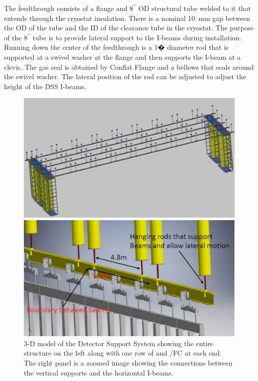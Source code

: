 The feedthrough consists of a flange and $8 ^{''}$ OD structural tube
welded to it that extends through the cryostat insulation.  There is a
nominal \SI{10}{mm} gap between the OD of the tube and the ID of the
clearance tube in the cryostat.  The purpose of the $8 ^{''}$ tube is
to provide lateral support to the I-beams during installation.
Running down the center of the feedthrough is a 1� diameter rod that
is supported at a swivel washer at the flange and then supports the
I-beam at a clevis.  The gas seal is obtained by Conflat Flange and a
bellows that seals around the swivel washer.  The lateral position of
the rod can be adjusted to adjust the height of the DSS I-beams.
\begin{figure}[htbp]
\begin{center}
\begin{minipage}[c]{0.49\textwidth}
\includegraphics[width=\textwidth]{far-detector-single-phase/figures/DSS-1.pdf}
\end{minipage}
\begin{minipage}[c]{0.49\textwidth}
\includegraphics[width=\textwidth]{far-detector-single-phase/figures/DSS-2.pdf}
\end{minipage}
\caption{3-D model of the Detector Support System showing the entire structure on the left along with one row of  and /FC at each end. The right panel is a zoomed image showing the connections between the vertical supports and the horizontal I-beams.}
\label{DSS}
\end{center}
\end{figure}


